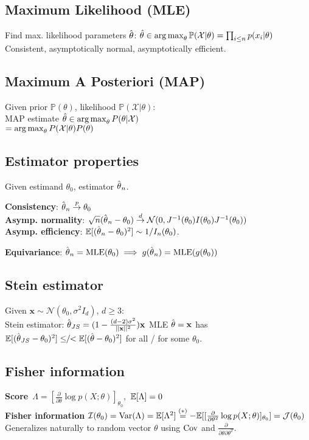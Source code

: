 \subsection*{Maximum Likelihood (MLE)}
Find  max. likelihood parameters $\hat{\kern0pt \theta}$:
$\hat{\theta}\in \operatorname*{arg\,max}_\theta \mathbb{P}(\mathcal{X}|\theta) =\prod_{i\leq n}p(x_i|\theta)$\\
Consistent, asymptotically normal, asymptotically efficient.

\subsection*{Maximum A Posteriori (MAP)}
Given prior $\mathbb{P}(\theta)$, likelihood $\mathbb{P}(\mathcal{X}|\theta)$:\\  MAP estimate $\hat{\theta}\in \operatorname*{arg\,max}_\theta P(\theta|\mathcal{X})$\\ $=\operatorname*{arg\,max}_\theta P(\mathcal{X}|\theta)P(\theta)$\\

\subsection*{Estimator properties}

Given estimand $\theta_0$, estimator $\hat{\kern0pt \theta}_n$.

\textbf{Consistency}: $\hat{\kern0pt \theta}_n \overset{p}{\to} \theta_0$\\
\textbf{Asymp. normality}: $\sqrt{n}(\hat{\kern0pt \theta}_n-\theta_0) \overset{d}{\to} \mathcal{N}(0, J^{-1}(\theta_0)I(\theta_0)J^{-1}(\theta_0))$\\
\textbf{Asymp. efficiency}:
$\mathbb{E}[(\hat{\kern0pt \theta}_n - \theta_0)^2]\sim 1/I_n(\theta_0)$.

\textbf{Equivariance}:
$\hat{\kern0pt \theta}_n = \textrm{MLE}(\theta_0) \implies g(\hat{\kern0pt \theta}_n) = \textrm{MLE}(g(\theta_0))$


\subsection*{Stein estimator}
Given $\mathbf{x} \sim \mathcal{N}(\theta_0, \sigma^2I_d)$, $d\geq3$:\\
Stein estimator: $\hat{\kern0pt \theta}_{JS} = (1-\frac{(d-2)\sigma^2}{||\mathbf{x}||^2})\mathbf{x}$
MLE $\hat{\kern0pt \theta} = \mathbf{x}$ has $\mathbb{E}[(\hat{\kern0pt \theta}_{JS} - \theta_0)^2] \leq\!\!/\!\!< \mathbb{E}[(\hat{\kern0pt \theta} - \theta_0)^2]$ for all / for some $\theta_0$.

\subsection*{Fisher information}
\mbox{\textbf{Score} $\Lambda = [\frac{\partial}{\partial\theta} \log p(X;\theta)]_{\theta_0}$, $\mathbb{E}[\Lambda] = 0$}\\
\textbf{Fisher information} $\mathcal{I}(\theta_0) = \mathrm{Var}(\Lambda) = \mathbb{E}[\Lambda^2] \overset{(*)}{=}
-\mathbb{E}[[\frac{\partial}{\partial\theta^2} \log p(X;\theta)]_{\theta_0}] = \mathcal{J}(\theta_0)$
Generalizes naturally to random vector $\mathbb{\theta}$ using $\mathrm{Cov}$ and $\frac{\partial}{\partial\theta\partial\theta^T}$.

